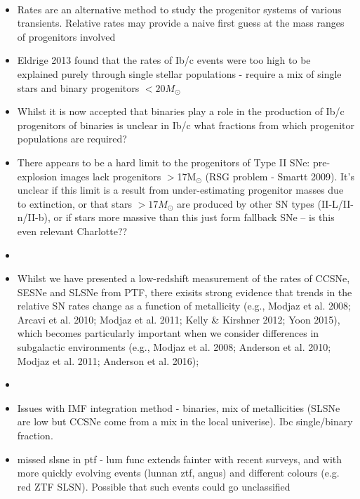 \documentclass[a4paper,fleqn,usenatbib]{mnras}
\newcommand{\angus}[1]{\color{JungleGreen}#1\color{black}}
\begin{document}
{\angus{{\bf Angus to organise into something coherant and flesh out with appropriate bullshit} \\

{\begin{itemize}
    \item Rates are an alternative method to study the progenitor systems of various transients. Relative rates may provide a naive first guess at the mass ranges of progenitors involved
    
    \item Eldrige 2013 found that the rates of Ib/c events were too high to be explained purely through single stellar populations - require a mix of single  stars and binary progenitors $<20M_{\odot}$
    
    \item Whilst it is now accepted that binaries play a role in the production of Ib/c progenitors of binaries is unclear in Ib/c what fractions from which progenitor populations are required? 
    
    \item There appears to be a hard limit to the progenitors of Type II SNe: pre-explosion images lack progenitors $>$17M$_{\odot}$ (RSG problem - Smartt 2009). It's unclear if this limit is a result from under-estimating progenitor masses due to extinction, or that stars $>17M_{\odot}$ are produced by other SN types (II-L/II-n/II-b), or if stars more massive than this just form fallback SNe -- is this even relevant Charlotte??
    
    \item 
    
    \item Whilst we have presented a low-redshift measurement of the rates of CCSNe, SESNe and SLSNe from PTF, there exisits strong evidence that trends in the relative SN rates change as a function of metallicity (e.g., Modjaz et al. 2008; Arcavi et al. 2010; Modjaz et al. 2011; Kelly & Kirshner 2012; Yoon 2015), which becomes particularly important when we consider differences in subgalactic environments (e.g., Modjaz et al. 2008; Anderson et al. 2010; Modjaz et al. 2011; Anderson et al. 2016); 
    
    \item 
    \item Issues with IMF integration method - binaries, mix of metallicities (SLSNe are low but CCSNe come from a mix in the local univerise). Ibc single/binary fraction. 
    \item missed slsne in ptf - lum func extends fainter with recent surveys, and with more quickly evolving events (lunnan ztf, angus) and different colours (e.g. red ZTF SLSN). Possible that such events could go unclassified
\end{itemize}}

}}
\end{document}
